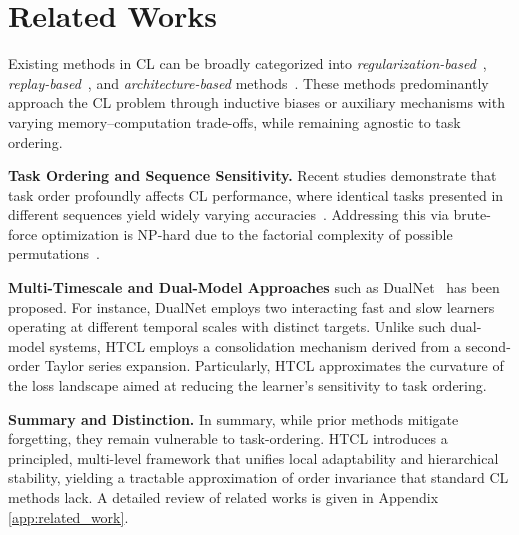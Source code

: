 \section{Related Works}
\label{sec:short-related-works}
Existing methods in CL can be broadly categorized into \emph{regularization-based}~\cite{kirkpatrick2017overcoming, zenke2017continual}, \emph{replay-based}~\cite{zhuo2023continual, buzzega2020dark, shin2017continual}, and \emph{architecture-based} methods~\cite{parisi2019continual, nguyen2019toward}. These methods predominantly approach the CL problem through inductive biases or auxiliary mechanisms with varying memory–computation trade-offs, while remaining agnostic to task ordering.%

\textbf{Task Ordering and Sequence Sensitivity.} Recent studies demonstrate that task order profoundly affects CL performance, where identical tasks presented in different sequences yield widely varying accuracies~\cite{bell2022effect, riemer2018learning}.  Addressing this via brute-force optimization is NP-hard due to the factorial complexity of possible permutations~\cite{knoblauch2020optimal}. %

\textbf{Multi-Timescale and Dual-Model Approaches} such as DualNet~\cite{pham2021dualnet} has been proposed. For instance, DualNet employs two interacting fast and slow learners operating at different temporal scales with distinct targets. Unlike such dual-model systems, HTCL employs a consolidation mechanism derived from a second-order Taylor series expansion. Particularly, HTCL approximates the curvature of the loss landscape aimed at reducing the learner's sensitivity to task ordering.

\textbf{Summary and Distinction.} In summary, while prior methods mitigate forgetting, they remain vulnerable to task-ordering. HTCL introduces a principled, multi-level framework that unifies local adaptability and hierarchical stability, yielding a tractable approximation of order invariance that standard CL methods lack.  A detailed review of related works is given in Appendix \ref{app:related_work}. 

